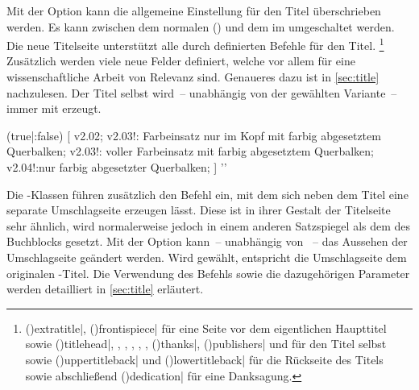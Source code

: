 \begin{DeclareEntity*}{}
\begin{DeclareEntity*}{}
\begin{DeclareEntity*}{}
\begin{Declaration}
Mit der Option  kann die allgemeine Einstellung für den Titel 
überschrieben werden. Es kann zwischen dem normalen () 
und dem im \CD umgeschaltet werden. Die neue Titelseite unterstützt alle durch 
\KOMAScript definierten Befehle für den Titel.%
\footnote{%
  \Macro(){extratitle|},
  \Macro(){frontispiece|} für eine 
  Seite vor dem eigentlichen Haupttitel sowie
  \Macro(){titlehead|},
  , ,
  , ,
  , \Macro(){thanks|}, 
  \Macro(){publishers|} und 
   für den Titel selbst sowie 
  \Macro(){uppertitleback|} und
  \Macro(){lowertitleback|} 
  für die Rückseite des Titels sowie abschließend 
  \Macro(){dedication|} für eine 
  Danksagung.
}
Zusätzlich werden viele neue Felder definiert, welche vor allem für eine 
wissenschaftliche Arbeit von Relevanz sind. Genaueres dazu ist in 
\autoref{sec:title} nachzulesen. Der Titel selbst wird~-- unabhängig von der 
gewählten Variante~-- immer mit  erzeugt.
\end{Declaration}

\begin{Declaration}
  {}
  (true|:false)
[%
  v2.02;%
  v2.03!:%
    Farbeinsatz nur im Kopf mit farbig abgesetztem Querbalken;
  v2.03!:%
    voller Farbeinsatz mit farbig abgesetztem Querbalken;
  v2.04!:nur farbig abgesetzter Querbalken;%
]
  '\cdalias'
\printdeclarationlist[Umschlagseite|?]

Die \TUDScript-Klassen führen zusätzlich den Befehl  ein, mit 
dem sich neben dem Titel eine separate Umschlagseite erzeugen lässt. Diese ist 
in ihrer Gestalt der Titelseite sehr ähnlich, wird normalerweise jedoch in 
einem anderen Satzspiegel als dem des Buchblocks gesetzt. Mit der Option 
 kann~-- unabhängig von ~-- das Aussehen der 
Umschlagseite geändert werden. Wird  gewählt, entspricht 
die Umschlagseite dem originalen \KOMAScript-Titel. Die Verwendung des Befehls 
 sowie die dazugehörigen Parameter werden detailliert in 
\autoref{sec:title} erläutert.
\end{Declaration}


\end{DeclareEntity*}
\end{DeclareEntity*}
\end{DeclareEntity*}
